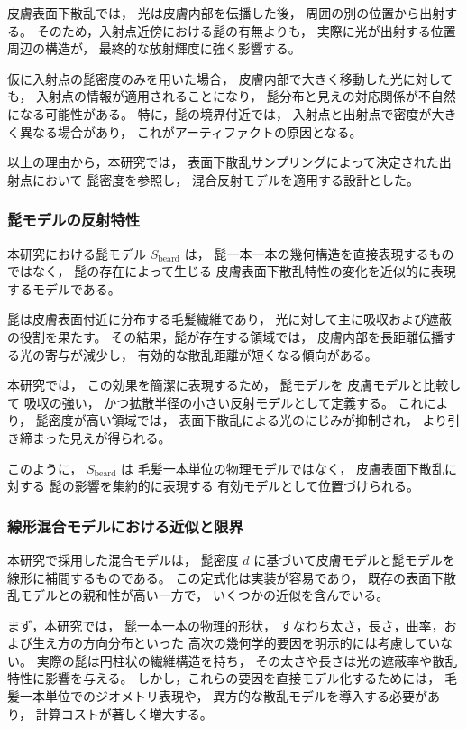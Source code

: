 皮膚表面下散乱では，
光は皮膚内部を伝播した後，
周囲の別の位置から出射する。
そのため，入射点近傍における髭の有無よりも，
実際に光が出射する位置周辺の構造が，
最終的な放射輝度に強く影響する。

仮に入射点の髭密度のみを用いた場合，
皮膚内部で大きく移動した光に対しても，
入射点の情報が適用されることになり，
髭分布と見えの対応関係が不自然になる可能性がある。
特に，髭の境界付近では，
入射点と出射点で密度が大きく異なる場合があり，
これがアーティファクトの原因となる。

以上の理由から，本研究では，
表面下散乱サンプリングによって決定された出射点において
髭密度を参照し，
混合反射モデルを適用する設計とした。
\subsubsection{髭モデルの反射特性}
本研究における髭モデル $S_{\mathrm{beard}}$ は，
髭一本一本の幾何構造を直接表現するものではなく，
髭の存在によって生じる
皮膚表面下散乱特性の変化を近似的に表現するモデルである。

髭は皮膚表面付近に分布する毛髪繊維であり，
光に対して主に吸収および遮蔽の役割を果たす。
その結果，髭が存在する領域では，
皮膚内部を長距離伝播する光の寄与が減少し，
有効的な散乱距離が短くなる傾向がある。

本研究では，
この効果を簡潔に表現するため，
髭モデルを
皮膚モデルと比較して
吸収の強い，
かつ拡散半径の小さい反射モデルとして定義する。
これにより，
髭密度が高い領域では，
表面下散乱による光のにじみが抑制され，
より引き締まった見えが得られる。

このように，
$S_{\mathrm{beard}}$ は
毛髪一本単位の物理モデルではなく，
皮膚表面下散乱に対する
髭の影響を集約的に表現する
有効モデルとして位置づけられる。

\subsubsection{線形混合モデルにおける近似と限界}
本研究で採用した混合モデルは，
髭密度 $d$ に基づいて皮膚モデルと髭モデルを線形に補間するものである。
この定式化は実装が容易であり，
既存の表面下散乱モデルとの親和性が高い一方で，
いくつかの近似を含んでいる。

まず，本研究では，
髭一本一本の物理的形状，
すなわち太さ，長さ，曲率，および生え方の方向分布といった
高次の幾何学的要因を明示的には考慮していない。
実際の髭は円柱状の繊維構造を持ち，
その太さや長さは光の遮蔽率や散乱特性に影響を与える。
しかし，これらの要因を直接モデル化するためには，
毛髪一本単位でのジオメトリ表現や，
異方的な散乱モデルを導入する必要があり，
計算コストが著しく増大する。


